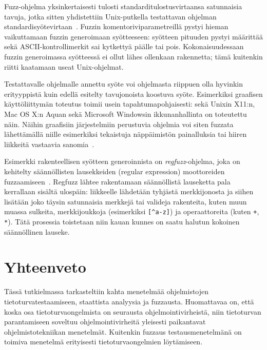 Fuzz-ohjelma yksinkertaisesti tulosti standarditulostusvirtaansa satunnaisia tavuja,
jotka sitten yhdistettiin Unix-putkella testattavan ohjelman standardisyötevirtaan~\cite{UnixReliability}.
Fuzzin komentoriviparametreillä pystyi hieman vaikuttamaan fuzzin generoimaan syötteeseen:
syötteen pituuden pystyi määrittää sekä ASCII-kontrollimerkit sai kytkettyä päälle tai pois.
Kokonaisuudessaan fuzzin generoimassa syötteessä ei ollut lähes ollenkaan rakennetta;
tämä kuitenkin riitti kaatamaan useat Unix-ohjelmat.

Testattavalle ohjelmalle annettu syöte voi ohjelmasta riippuen olla
hyvinkin erityyppistä kuin edellä esitelty tavujonoista koostuva syöte.
Esimerkiksi graafisen käyttöliittymän toteutus toimii usein tapahtumapohjaisesti:
sekä Unixin X11:n, Mac OS X:n Aquan sekä Microsoft Windowsin ikkunanhallinta on toteutettu näin.
Näihin graafisiin järjestelmiin perustuvia ohjelmia voi siten fuzzata lähettämällä
niille esimerkiksi tekaistuja näppäimistön painalluksia tai hiiren liikkeitä vastaavia
sanomia~\cite{X11Fuzz,MacOsFuzz,WinNtFuzz}.

Esimerkki rakenteellisen syötteen generoinnista on \emph{regfuzz}-ohjelma,
joka on kehitelty säännöllisten lausekkeiden (regular expression) moottoreiden
fuzzaamiseen~\cite{RegFuzz}.
Regfuzz lähtee rakentamaan säännöllistä lauseketta pala kerrallaan sisältä ulospäin:
liikkeelle lähdetään tyhjästä merkkijonosta ja siihen lisätään joko täysin
satunnaisia merkkejä tai valideja rakenteita,
kuten muun muassa sulkeita, merkkijoukkoja (esimerkiksi \texttt{[\^{}a-z]}) ja
operaattoreita (kuten \texttt{+}, \texttt{*}).
Tätä prosessia toistetaan niin kauan kunnes on saatu halutun kokoinen säännöllinen lauseke.

\section{Yhteenveto}
Tässä tutkielmassa tarkasteltiin kahta menetelmää ohjelmistojen tietoturvatestaamiseen,
staattista analyysia ja fuzzausta.
Huomattavaa on, että koska osa tietoturvaongelmista on seurausta ohjelmointivirheistä,
niin tietoturvan parantamiseen soveltuu ohjelmointivirheitä yleisesti paikantavat ohjelmistotekniikan menetelmät.
Kuitenkin fuzzaus testausmenetelmänä on toimiva menetelmä erityisesti tietoturvaongelmien löytämiseen.
